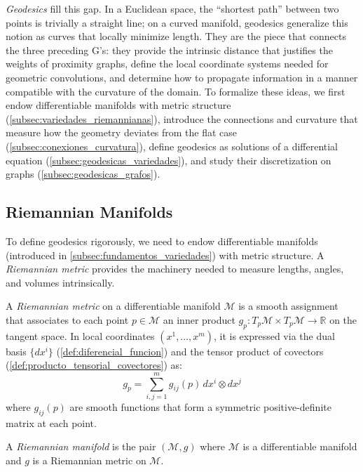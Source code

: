 \textit{Geodesics} fill this gap. In a Euclidean space, the ``shortest path'' between two points is trivially a straight line; on a curved manifold, geodesics generalize this notion as curves that locally minimize length. They are the piece that connects the three preceding G's: they provide the intrinsic distance that justifies the weights of proximity graphs, define the local coordinate systems needed for geometric convolutions, and determine how to propagate information in a manner compatible with the curvature of the domain. To formalize these ideas, we first endow differentiable manifolds with metric structure (\autoref{subsec:variedades_riemannianas}), introduce the connections and curvature that measure how the geometry deviates from the flat case (\autoref{subsec:conexiones_curvatura}), define geodesics as solutions of a differential equation (\autoref{subsec:geodesicas_variedades}), and study their discretization on graphs (\autoref{subsec:geodesicas_grafos}).

\subsection{Riemannian Manifolds}\label{subsec:variedades_riemannianas}

To define geodesics rigorously, we need to endow differentiable manifolds (introduced in \autoref{subsec:fundamentos_variedades}) with metric structure. A \textit{Riemannian metric} provides the machinery needed to measure lengths, angles, and volumes intrinsically.

\begin{definition}\label{def:metrica_riemanniana}
A \textit{Riemannian metric} on a differentiable manifold $\mathcal{M}$ is a smooth assignment that associates to each point $p \in \mathcal{M}$ an inner product $g_p: T_p\mathcal{M} \times T_p\mathcal{M} \to \mathbb{R}$ on the tangent space. In local coordinates $(x^1, \ldots, x^m)$, it is expressed via the dual basis $\{dx^i\}$ (\autoref{def:diferencial_funcion}) and the tensor product of covectors (\autoref{def:producto_tensorial_covectores}) as:
\[
g_p = \sum_{i,j=1}^m g_{ij}(p) \, dx^i \otimes dx^j
\]
where $g_{ij}(p)$ are smooth functions that form a symmetric positive-definite matrix at each point.
\end{definition}

\begin{definition}\label{def:variedad_riemanniana}
A \textit{Riemannian manifold} is the pair $(\mathcal{M}, g)$ where $\mathcal{M}$ is a differentiable manifold and $g$ is a Riemannian metric on $\mathcal{M}$.
\end{definition}

